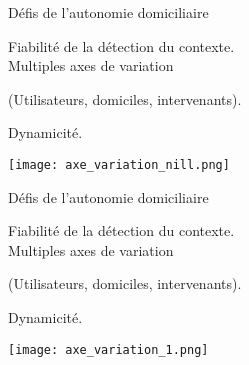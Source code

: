 \begin{frame}{Défis de l'autonomie domiciliaire}
\vspace*{-6.3mm}
\begin{minipage}{.4\linewidth}
\small
Fiabilité de la détection du contexte. 
\\
Multiples axes de variation 
\begin{scriptsize}
(Utilisateurs, domiciles, intervenants).
\end{scriptsize}

Dynamicité.
\end{minipage}
\hfill
\begin{minipage}{.5\linewidth}
    \texttt{[image: axe\_variation\_nill.png]}
\end{minipage}
\vfill
\end{frame}

\begin{frame}{Défis de l'autonomie domiciliaire}
  \addtocounter{framenumber}{-1}
\vspace*{-6.3mm}
\begin{minipage}{.4\linewidth}
\small
Fiabilité de la détection du contexte. 
\\
Multiples axes de variation 
\begin{scriptsize}
(Utilisateurs, domiciles, intervenants).
\end{scriptsize}

Dynamicité.
\end{minipage}
\hfill
\begin{minipage}{.5\linewidth}
    \texttt{[image: axe\_variation\_1.png]}
\end{minipage}
\vfill
\end{frame}

